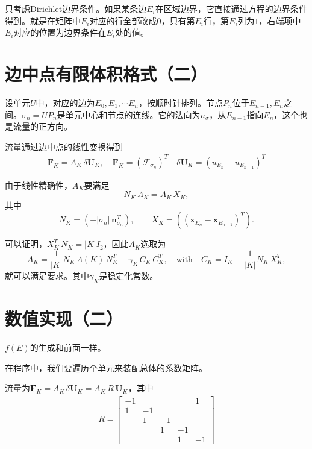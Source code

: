 \documentclass[12pt,a4paper]{article}
\theoremstyle{plain}
\begin{document}
只考虑Dirichlet边界条件。如果某条边$E_i$在区域边界，它直接通过方程的边界条件得到。就是在矩阵中$E_i$对应的行全部改成0，只有第$E_i$行，第$E_i$列为$1$，右端项中$E_i$对应的位置为边界条件在$E_i$处的值。

\section*{边中点有限体积格式（二）}

设单元$U$中，对应的边为$E_0, E_1, \cdots E_n$，按顺时针排列。节点$P_n$位于$E_{n-1}, E_{n}$之间。$\sigma_n = U P_{n}$是单元中心和节点的连线。它的法向为$n_\sigma$，从$E_{n-1}$指向$E_n$，这个也是流量的正方向。

流量通过边中点的线性变换得到
\begin{align*}
\mathbf{F}_{K} = A_K \, \delta \mathbf{U}_{K}, \quad \mathbf{F}_{K} = (\mathcal{F}_{\sigma_{n}})^T \quad \delta \mathbf{U}_{K} = (u_{E_{n}} - u_{E_{n-1}})^T
\end{align*}

由于线性精确性，$A_K$要满足
\begin{equation*}\label{lp-mat}
N_{K} \, \Lambda_{K} = A_{K} \, X_{K},
\end{equation*}
其中
\begin{equation*}\label{def-nx}
N_K = (- |\sigma_n| \, \mathbf{n}_{\sigma_n}^T), \qquad X_K = ((\mathbf{x}_{E_{n}} - \mathbf{x}_{E_{n-1}})^T).
\end{equation*}

可以证明，$X_K^T \, N_K = |K| I_2$，因此$A_K$选取为
\begin{equation*}
A_K = \frac{1}{|K|} N_K \, \Lambda(K) \, N_K^T + \gamma_K \, C_K \, C_K^T, \quad  \text{with} \quad C_K = I_K - \frac{1}{|K|} N_K \, X_K^T,
\end{equation*}
就可以满足要求。其中$\gamma_K$是稳定化常数。

\section*{数值实现（二）}

$f(E)$的生成和前面一样。

在程序中，我们要遍历个单元来装配总体的系数矩阵。

流量为$ \mathbf{F}_{K} = A_K \, \delta \mathbf{U}_{K} = A_K \, R \, \mathbf{U}_{K} $，其中
\begin{align*}
R =
\left[
\begin{matrix}
-1 &  &  &  & 1 \\
1 & -1 &  &  &  \\
 & 1 & -1 &  &  \\
 &  & 1 & -1 &  \\
 &  &  & 1 & -1
\end{matrix}
\right]
\end{align*}
\end{document}

